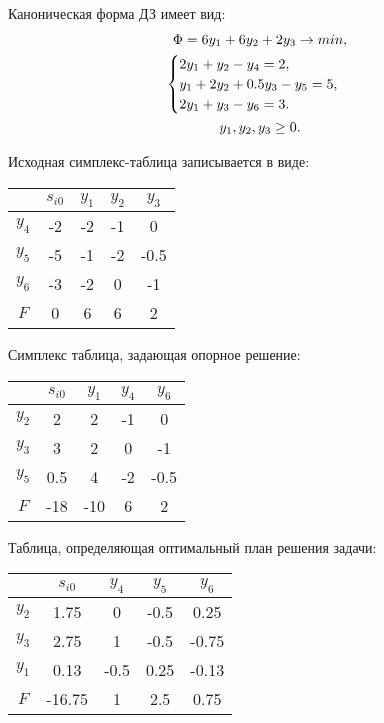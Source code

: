 \documentclass[12pt,a4paper,oneside]{extarticle}
\begin{document}
    Каноническая форма ДЗ имеет вид:
    \begin{gather}
        \Phi = 6y_1 + 6y_2 + 2y_3 \rightarrow min,  \notag  \\
        \begin{cases}
            2y_1 + y_2 - y_4 = 2, \\
            y_1 + 2y_2 + 0.5y_3 - y_5 = 5, \\
            2y_1 + y_3 - y_6 = 3.
        \end{cases} \notag \\
        y_1, y_2, y_3 \geq 0. \notag
    \end{gather} 

    Исходная симплекс-таблица записывается в виде:
    \begin{center}
        \begin{tabular}{|c|c|c|c|c|}
            \hline
                 & $s_{i0}$ & $y_1$ & $y_2$ & $y_3$ \\ \hline
            $y_4$ & -2      & -2    & -1    & 0 \\ \hline
            $y_5$ & -5      & -1    & -2    & -0.5 \\ \hline
            $y_6$ & -3      & -2    & 0     & -1 \\ \hline
            $F$   & 0       & 6     & 6     & 2 \\ \hline
        \end{tabular}
    \end{center}

    Симплекс таблица, задающая опорное решение:
    \begin{center}
        \begin{tabular}{|c|c|c|c|c|}
            \hline
                 & $s_{i0}$ & $y_1$ & $y_4$ & $y_6$ \\ \hline
            $y_2$ & 2       & 2     & -1    & 0 \\ \hline
            $y_3$ & 3       & 2     & 0     & -1 \\ \hline
            $y_5$ & 0.5     & 4     & -2    & -0.5 \\ \hline
            $F$   & -18     & -10   & 6     & 2 \\ \hline
        \end{tabular}
    \end{center}
    
    
    Таблица, определяющая оптимальный план решения задачи:
    \begin{center}
        \begin{tabular}{|c|c|c|c|c|}
            \hline
                 & $s_{i0}$ & $y_4$ & $y_5$ & $y_6$ \\ \hline
            $y_2$ & 1.75    & 0     & -0.5  & 0.25 \\ \hline
            $y_3$ & 2.75    & 1     & -0.5  & -0.75 \\ \hline
            $y_1$ & 0.13    & -0.5  & 0.25  & -0.13 \\ \hline
            $F$   & -16.75  & 1     & 2.5   & 0.75 \\ \hline
        \end{tabular}
    \end{center}
\end{document}

